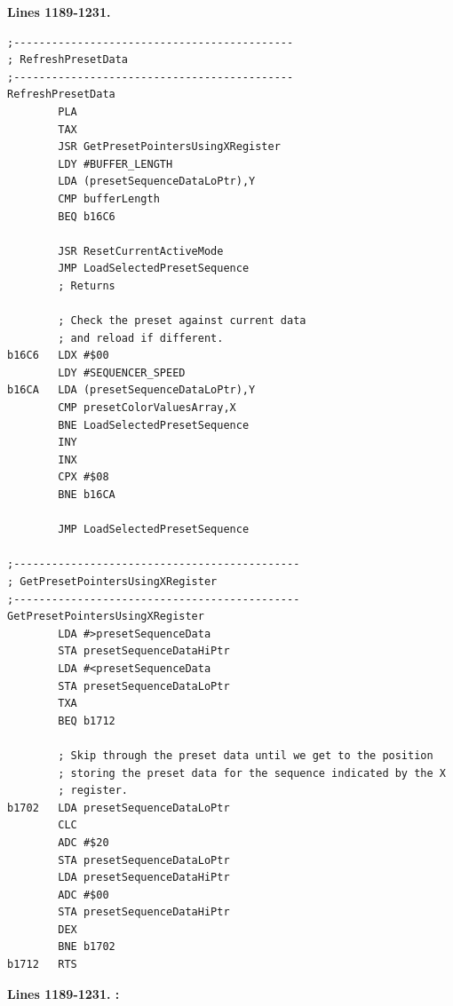 \clearpage
\textbf{Lines 1189-1231. } 
\begin{lstlisting}[basicstyle=\ttfamily\scriptsize]
;--------------------------------------------
; RefreshPresetData
;--------------------------------------------
RefreshPresetData    
        PLA 
        TAX 
        JSR GetPresetPointersUsingXRegister
        LDY #BUFFER_LENGTH
        LDA (presetSequenceDataLoPtr),Y
        CMP bufferLength
        BEQ b16C6

        JSR ResetCurrentActiveMode
        JMP LoadSelectedPresetSequence
        ; Returns

        ; Check the preset against current data
        ; and reload if different.
b16C6   LDX #$00
        LDY #SEQUENCER_SPEED
b16CA   LDA (presetSequenceDataLoPtr),Y
        CMP presetColorValuesArray,X
        BNE LoadSelectedPresetSequence
        INY 
        INX 
        CPX #$08
        BNE b16CA

        JMP LoadSelectedPresetSequence

;---------------------------------------------
; GetPresetPointersUsingXRegister
;---------------------------------------------
GetPresetPointersUsingXRegister   
        LDA #>presetSequenceData
        STA presetSequenceDataHiPtr
        LDA #<presetSequenceData
        STA presetSequenceDataLoPtr
        TXA 
        BEQ b1712

        ; Skip through the preset data until we get to the position
        ; storing the preset data for the sequence indicated by the X
        ; register.
b1702   LDA presetSequenceDataLoPtr
        CLC 
        ADC #$20
        STA presetSequenceDataLoPtr
        LDA presetSequenceDataHiPtr
        ADC #$00
        STA presetSequenceDataHiPtr
        DEX 
        BNE b1702
b1712   RTS 

\end{lstlisting}
\clearpage

\textbf{Lines 1189-1231. :} 
\clearpage


